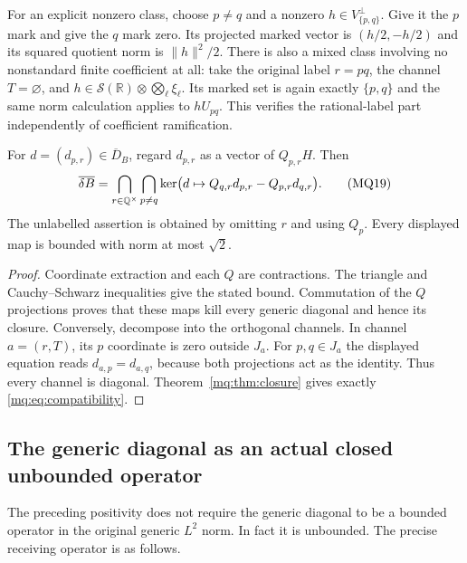For an explicit nonzero class, choose $p\ne q$ and a nonzero
$h\in V_{\{p,q\}}^\perp$. Give it the $p$ mark and give the
$q$ mark zero. Its projected marked vector is $(h/2,-h/2)$
and its squared quotient norm is $\|h\|^2/2$. There is also a
mixed class involving no nonstandard finite coefficient at all:
take the original label $r=pq$, the channel $T=\varnothing$,
and $h\in\mathcal S(\mathbb R)\otimes\bigotimes_\ell\xi_\ell$.
Its marked set is again exactly $\{p,q\}$ and the same norm
calculation applies to $hU_{pq}$. This verifies the rational-label
part independently of coefficient ramification.

\begin{proposition}
\label{mq:prop:compatibility}
For $d=(d_{p,r})\in\overline D_B$, regard $d_{p,r}$ as a vector
of $Q_{p,r}H$. Then
\[
 \overline{\delta B}
 =\bigcap_{r\in\mathbb Q^\times}\bigcap_{p\ne q}
   \ker\bigl(d\mapsto Q_{q,r}d_{p,r}-Q_{p,r}d_{q,r}\bigr).
 \tag{MQ19}\label{mq:eq:compatibility}
\]
The unlabelled assertion is obtained by omitting $r$ and using
$Q_p$. Every displayed map is bounded with norm at most $\sqrt2$.
\end{proposition}
\begin{proof}
Coordinate extraction and each $Q$ are contractions. The triangle
and Cauchy--Schwarz inequalities give the stated bound. Commutation
of the $Q$ projections proves that these maps kill every generic
diagonal and hence its closure. Conversely, decompose into the
orthogonal channels. In channel $a=(r,T)$, its $p$ coordinate is
zero outside $J_a$. For $p,q\in J_a$ the displayed equation reads
$d_{a,p}=d_{a,q}$, because both projections act as the identity.
Thus every channel is diagonal. Theorem~\ref{mq:thm:closure} gives
exactly \eqref{mq:eq:compatibility}.
\end{proof}

\subsection{The generic diagonal as an actual closed unbounded operator}

The preceding positivity does not require the generic diagonal to
be a bounded operator in the original generic $L^2$ norm. In fact
it is unbounded. The precise receiving operator is as follows.

